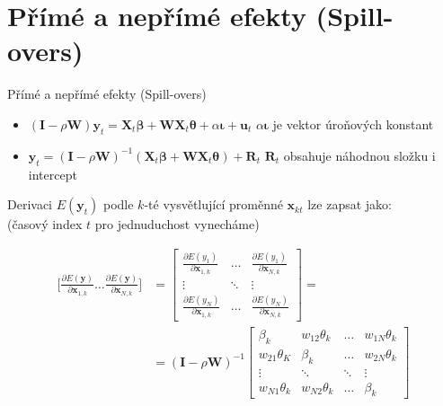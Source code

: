 \documentclass{beamer}
\begin{document}
\section{Přímé a nepřímé efekty (Spill-overs)}
\begin{frame}{Přímé a nepřímé efekty (Spill-overs)}
\begin{itemize}
	\item $(\bm{I} - \rho \bm{W}) \bm{y}_t = \bm{X}_t \bm{\beta} + \bm{W}\bm{X}_t\bm{\theta} + \alpha \bm{\iota} +\bm{u}_t$ \quad $ \alpha \bm{\iota}$ je vektor úroňových konstant
	\item $\bm{y}_t = (\bm{I} - \rho \bm{W})^{-1} (\bm{X}_t\bm{\beta} + \bm{W}\bm{X}_t \bm{\theta})+ \bm{R}_t$ \quad 
	$\bm{R}_t$ obsahuje náhodnou složku i intercept 
\end{itemize}
Derivaci $E(\bm{y}_t)$ podle $k$-té vysvětlující proměnné $\bm{x}_{kt}$ lze zapsat jako:\\(časový index $t$ pro jednuduchost vynecháme)

\begin{align*} \bigg[\frac{\partial E(\bm{y})}{\partial \bm{x}_{1,k}} \dots \frac{\partial E(\bm{y})}{\partial \bm{x}_{N,k}}\bigg] & =
\begin{bmatrix}
\frac{\partial E(y_1)}{\partial \bm{x}_{1,k}} & \dots & \frac{\partial E(y_1)}{\partial \bm{x}_{N,k}} \\
\vdots & \ddots & \vdots \\
\frac{\partial E(y_N)}{\partial \bm{x}_{1,k}} & \dots & \frac{\partial E(y_N)}{\partial \bm{x}_{N,k}}
\end{bmatrix} = \\
& = (\bm{I} - \rho \bm{W})^{-1} 
\begin{bmatrix}
\beta_k & w_{12}\theta_k & \dots & w_{1N}\theta_k \\
w_{21}\theta_K & \beta_k & \dots & w_{2N}\theta_k \\
\vdots & \ddots & \ddots & \vdots \\
w_{N1}\theta_k & w_{N2}\theta_k & \dots & \beta_k 
\end{bmatrix}
\end{align*}
\end{frame}
\end{document}
